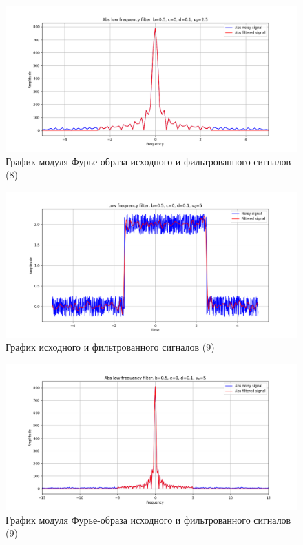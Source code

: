 \documentclass[a4paper, 12pt]{article}
\begin{document}
    \begin{figure}[!htb]
        \centering
        \includegraphics[scale=0.48]{13_abs_u_U_nohigh.png}
        \captionsetup{skip=0pt}
        \caption{График модуля Фурье-образа исходного и фильтрованного сигналов (8)}
        \label{fig:fig16}
    \end{figure}
    \begin{figure}[!htb]
        \centering
        \includegraphics[scale=0.48]{8_u_flt_u_nohigh.png}
        \captionsetup{skip=0pt}
        \caption{График исходного и фильтрованного сигналов (9)}
        \label{fig:fig17}
    \end{figure}
    \begin{figure}[!htb]
        \centering
        \includegraphics[scale=0.48]{8_abs_u_U_nohigh.png}
        \captionsetup{skip=0pt}
        \caption{График модуля Фурье-образа исходного и фильтрованного сигналов (9)}
        \label{fig:fig18}
    \end{figure}
\end{document}
